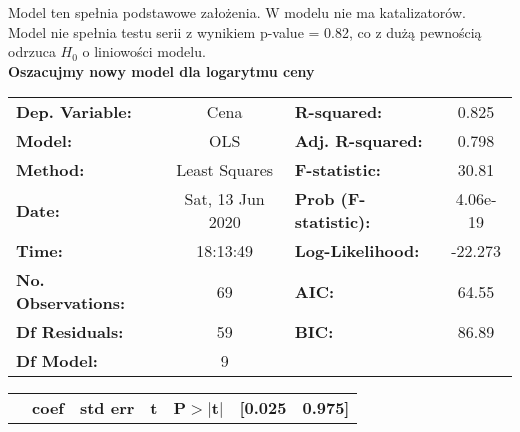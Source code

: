 \documentclass[11pt,a4paper]{article}
\begin{document}
		Model ten spełnia podstawowe założenia. W modelu nie ma katalizatorów.  \\
		Model nie spełnia testu serii  z wynikiem p-value = 0.82, co z dużą pewnością odrzuca $H_0$ o liniowości modelu.\\
		
	\textbf{	Oszacujmy nowy model dla logarytmu ceny }
		
		\begin{center}
			\begin{tabular}{lclc}
				 
				\textbf{Dep. Variable:}           &       Cena       & \textbf{  R-squared:         } &     0.825   \\
				\textbf{Model:}                   &       OLS        & \textbf{  Adj. R-squared:    } &     0.798   \\
				\textbf{Method:}                  &  Least Squares   & \textbf{  F-statistic:       } &     30.81   \\
				\textbf{Date:}                    & Sat, 13 Jun 2020 & \textbf{  Prob (F-statistic):} &  4.06e-19   \\
				\textbf{Time:}                    &     18:13:49     & \textbf{  Log-Likelihood:    } &   -22.273   \\
				\textbf{No. Observations:}        &          69      & \textbf{  AIC:               } &     64.55   \\
				\textbf{Df Residuals:}            &          59      & \textbf{  BIC:               } &     86.89   \\
				\textbf{Df Model:}                &           9      & \textbf{                     } &             \\
				 
			\end{tabular}
			\begin{tabular}{lcccccc}
				& \textbf{coef} & \textbf{std err} & \textbf{t} & \textbf{P$> |$t$|$} & \textbf{[0.025} & \textbf{0.975]}  \\
				 

\end{tabular}
\end{center}
\end{document}
